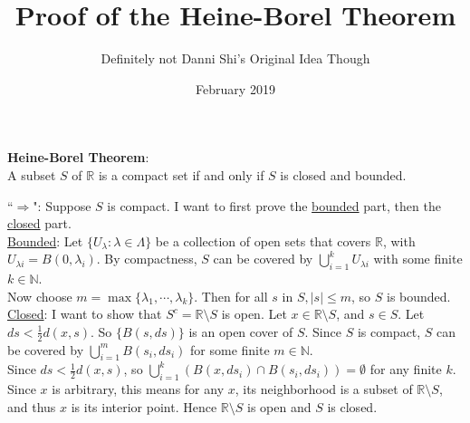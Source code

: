 \documentclass[11pt,letterpaper]{article}
\title{Proof of the Heine-Borel Theorem}
\author{Definitely not Danni Shi's Original Idea Though}
\date{February 2019}
\begin{document}
\maketitle
\begin{center}
\noindent \textbf{Heine-Borel Theorem}:\\
A subset $S$ of $\mathbb{R}$ is a compact set if and only if $S$ is closed and bounded.
\end{center}
``\underline{$\Rightarrow$}": Suppose $S$ is compact. I want to first prove the \underline{bounded} part, then the \underline{closed} part.\\
\underline{Bounded}: Let $\{U_\lambda: \lambda \in \Lambda\}$ be a collection of open sets that covers $\mathbb{R}$, with $U_{\lambda i} = B(0, \lambda_i)$. By compactness, $S$ can be covered by $\bigcup_{i=1}^k U_{\lambda i}$ with some finite $k \in \mathbb{N}$. \\
\noindent Now choose $m = \max \{\lambda_1, \cdots, \lambda_k\}$. Then for all $s \text{ in } S, |s| \leq m$, so $S$ is bounded.\\
\underline{Closed}: I want to show that $S^c = \mathbb{R} \setminus S$ is open. Let $x \in \mathbb{R} \setminus S$, and $s\in S$. Let $ds < \frac{1}{2} d(x,s)$. So $\{B(s, ds)\}$ is an open cover of $S$. Since $S$ is compact, $S$ can be covered by $\bigcup_{i=1}^m B(s_i, ds_i)$ for some finite $m \in \mathbb{N}$.\\
Since $ds < \frac{1}{2} d(x,s)$, so $\bigcup_{i=1}^k \left(B(x, ds_i) \cap B(s_i, ds_i) \right) = \emptyset$ for any finite $k$.\\
Since $x$ is arbitrary, this means for any $x$, its neighborhood is a subset of $\mathbb{R}\setminus S$, and thus $x$ is its interior point. Hence $\mathbb{R}\setminus S$ is open and $S$ is closed.\\
\end{document}
